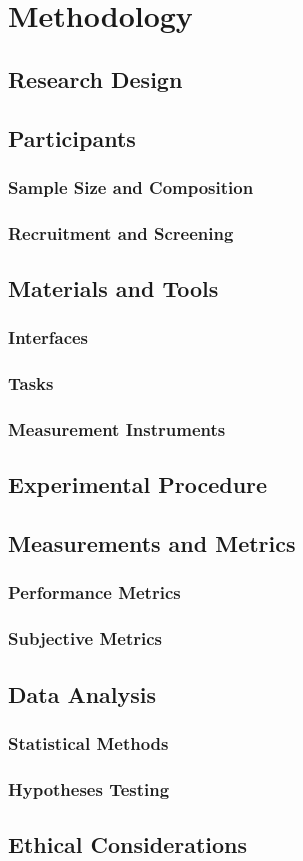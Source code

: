 
\chapter{Methodology}\label{chapter:methodology}

\section{Research Design}

\section{Participants}
\subsection{Sample Size and Composition}
\subsection{Recruitment and Screening}

\section{Materials and Tools}
\subsection{Interfaces}
\subsection{Tasks}
\subsection{Measurement Instruments}

\section{Experimental Procedure}

\section{Measurements and Metrics}
\subsection{Performance Metrics}
\subsection{Subjective Metrics}

\section{Data Analysis}
\subsection{Statistical Methods}
\subsection{Hypotheses Testing}

\section{Ethical Considerations}